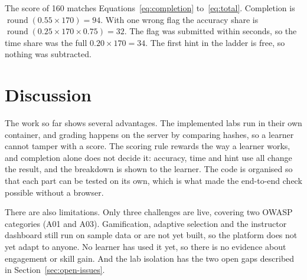 The score of 160 matches Equations~\eqref{eq:completion} to~\eqref{eq:total}. Completion is $\operatorname{round}(0.55 \times 170) = 94$. With one wrong flag the accuracy share is $\operatorname{round}(0.25 \times 170 \times 0.75) = 32$. The flag was submitted within seconds, so the time share was the full $0.20 \times 170 = 34$. The first hint in the ladder is free, so nothing was subtracted.

\section{Discussion}

The work so far shows several advantages. The implemented labs run in their own container, and grading happens on the server by comparing hashes, so a learner cannot tamper with a score. The scoring rule rewards the way a learner works, and completion alone does not decide it: accuracy, time and hint use all change the result, and the breakdown is shown to the learner. The code is organised so that each part can be tested on its own, which is what made the end-to-end check possible without a browser.

There are also limitations. Only three challenges are live, covering two OWASP categories (A01 and A03). Gamification, adaptive selection and the instructor dashboard still run on sample data or are not yet built, so the platform does not yet adapt to anyone. No learner has used it yet, so there is no evidence about engagement or skill gain. And the lab isolation has the two open gaps described in Section~\ref{sec:open-issues}.
